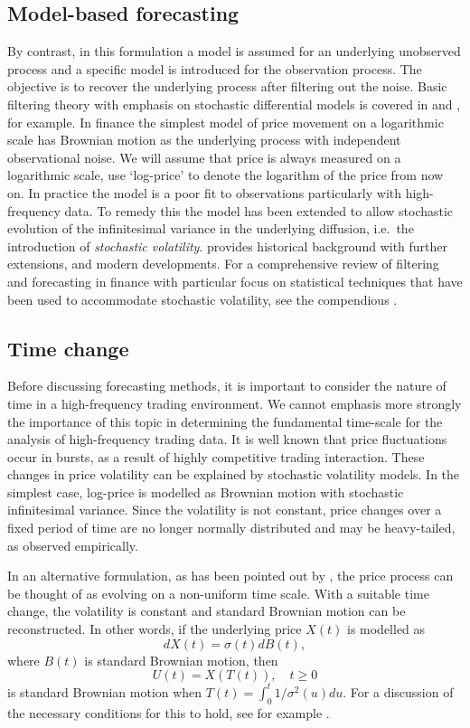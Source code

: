 \subsection{Model-based forecasting}
By contrast, in this formulation a model is assumed for an underlying unobserved process and a specific model is introduced for the observation process. The objective is to recover the underlying process after filtering out the noise. Basic filtering theory with emphasis on stochastic differential models is covered in \citet{davis1997linear} and \citet{oksendal2003stochastic}, for example.  In finance the simplest model of price movement on a logarithmic scale has Brownian motion as the underlying process with independent observational noise. We will assume that price is always measured on a logarithmic scale, use `log-price' to denote the logarithm of the price from now on. In practice the model is a poor fit to observations particularly with high-frequency data. To remedy this the model has been extended to allow stochastic evolution of the infinitesimal variance in the underlying diffusion, i.e.\ the introduction of \emph{stochastic volatility}. \citet{shephard2015martingale} provides historical background  with further extensions, and modern developments. For a comprehensive review of filtering and forecasting in finance with particular focus on statistical techniques that have been used to accommodate stochastic volatility, see the compendious \citet{bauwens2012handbook}.

\subsection{Time change}\label{sec:timechange}
Before discussing forecasting methods, it is important to consider the nature of time in a high-frequency trading environment. We cannot emphasis more strongly the importance of this topic in determining the fundamental time-scale for the analysis of high-frequency trading data. It is well known that price fluctuations occur in  bursts, as a result of highly competitive trading interaction. These changes in price volatility can be explained by stochastic volatility models. In the simplest case, log-price is modelled as Brownian motion with stochastic infinitesimal variance.  Since the volatility is not constant, price changes over a fixed period of time are no longer normally distributed and may be heavy-tailed, as observed empirically. 

In an alternative formulation, as has been pointed out by \citet{clark1973subordinated}, the price process can be thought of as evolving on a non-uniform time scale.  With a suitable time change, the volatility is constant and standard Brownian motion can be reconstructed. In other words, if the underlying price $X(t)$ is modelled as
$$
dX(t) = \sigma(t) dB(t),
$$
where $B(t)$ is standard Brownian motion, then  
\begin{equation}U(t) = X(T(t)),\quad  t \geqslant 0
\end{equation} is standard Brownian motion when $T(t) = \int_0^t 1/\sigma^2(u) du$. For a discussion of the necessary conditions for this to hold, see for example \citet{veraart2010timechange}. 

